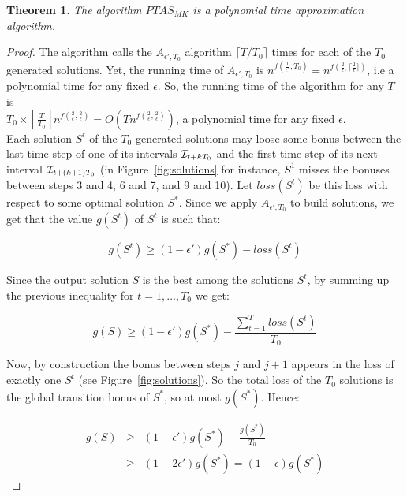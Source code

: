 \documentclass[a4paper]{book}
\newtheorem{theorem}{Theorem}[chapter]
\newtheorem{proof}{\noindent{\bf Proof.} }
\begin{document}


\begin{theorem}\label{thptasgen}
The algorithm $PTAS_{MK}$ is a polynomial time approximation algorithm.
\end{theorem}



\begin{proof}
The algorithm calls the $A_{\epsilon',T_0}$ algorithm $\lceil T/T_0 \rceil$ times for each of the $T_0$ generated solutions. Yet, the running time of  $A_{\epsilon',T_0}$ is  $n^{f(\frac{1}{\epsilon'},T_0)}=n^{f(\frac{2}{\epsilon},\lceil \frac{2}{\epsilon}\rceil)}$, i.e a polynomial time for any fixed $\epsilon$.  So, the running time of the algorithm for any $T$ is\\ $T_0\times \left \lceil \frac{T}{T_0} \right \rceil n^{f(\frac{2}{\epsilon},\frac{2}{\epsilon})} = O(T n^{f(\frac{2}{\epsilon},\frac{2}{\epsilon})})$, a polynomial time for any fixed $\epsilon$. \\

Each solution $S^t$ of the $T_0$ generated solutions may loose some bonus between the last time step of one of its intervals ${\cal I}_{t+kT_0}$ and the first time step of its next interval ${\cal I}_{t+(k+1)T_0}$ (in Figure~\ref{fig:solutions} for instance, $S^1$ misses the bonuses between steps 3 and 4, 6 and 7, and 9 and 10). Let $loss(S^t)$ be this loss with respect to some optimal solution $S^*$. Since we apply $A_{\epsilon',T_0}$ to build solutions, we get that the value $g(S^t)$ of $S^t$ is such that:

$$g(S^t)\geq (1-\epsilon') g(S^*) - loss(S^t)$$

Since the output solution $S$ is the best among the solutions $S^t$, by summing up the previous inequality for $t=1,\dots,T_0$ we get:

$$g(S)\geq (1-\epsilon') g(S^*)-\frac{\sum_{t=1}^T loss(S^t)}{T_0}$$

Now, by construction the bonus between steps $j$ and $j+1$ appears in the loss of  exactly one $S^t$ (see Figure~\ref{fig:solutions}). So the total loss of the $T_0$ solutions is the global transition bonus of $S^*$, so at most $g(S^*)$. Hence:

\begin{eqnarray*}
g(S) &\geq &  (1-\epsilon')g(S^*)-\frac{g(S^*)}{T_0} \\
&\geq&(1-2\epsilon')g(S^*) = (1-\epsilon) g(S^*)
\end{eqnarray*} 


\end{proof}
\end{document}
